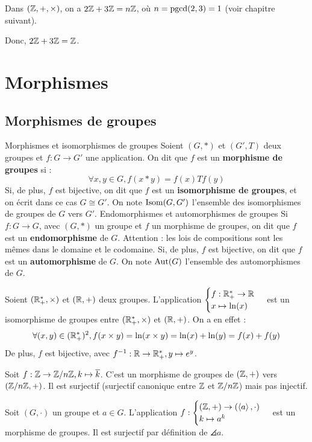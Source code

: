 \documentclass[12pt, a4paper]{report}
\begin{document}
\begin{example}
    Dans $(\mathbb{Z},+,\times)$, on a $2\mathbb{Z} + 3\mathbb{Z} = n\mathbb{Z}$, où $n = \mathrm{pgcd}(2,3) = 1$ (voir chapitre suivant).

    Donc, $2\mathbb{Z} + 3\mathbb{Z} = \mathbb{Z}$.
\end{example}

\chapter{Morphismes}

\section{Morphismes de groupes}

\begin{definition}
    \begin{outline}
        \1 Morphismes et isomorphismes de groupes
        \2 Soient $(G,*)$ et $(G',T)$ deux groupes et $f:G\to G'$ une application. On dit que $f$ est un \textbf{morphisme de groupes} si :
        $$\forall x,y \in G, f(x * y) = f(x) T f(y)$$
        \2 Si, de plus, $f$ est bijective, on dit que $f$ est un \textbf{isomorphisme de groupes}, et on écrit dans ce cas $G \cong G'$. On note $\mathrm{Isom}(G,G')$ l'ensemble des isomorphismes de groupes de $G$ vers $G'$.
        \1 Endomorphismes et automorphismes de groupes
        \2 Si $f:G\to G$, avec $(G,*)$ un groupe et $f$ un morphisme de groupes, on dit que $f$ est un \textbf{endomorphisme} de $G$. Attention : les lois de compositions sont les mêmes dans le domaine et le codomaine.
        \2 Si, de plus, $f$ est bijective, on dit que $f$ est un \textbf{automorphisme} de $G$. On note $\mathrm{Aut}(G)$ l'ensemble des automorphismes de $G$.
    \end{outline}
\end{definition}

\begin{example}
    Soient $(\mathbb{R}_+^*,\times)$ et $(\mathbb{R},+)$ deux groupes. L'application $\begin{cases}f : \mathbb{R}_+^* \to \mathbb{R}\\ x \mapsto \ln(x)\end{cases}$ est un isomorphisme de groupes entre $(\mathbb{R}_+^*,\times)$ et $(\mathbb{R},+)$. On a en effet :
    $$\forall (x,y) \in (\mathbb{R}_+^*)^2, f(x \times y) = \ln(x \times y) = \ln(x) + \ln(y) = f(x) + f(y)$$
    De plus, $f$ est bijective, avec $f^{-1} : \mathbb{R} \to \mathbb{R}_+^*, y \mapsto e^y$.

    Soit $f: \mathbb{Z} \to \mathbb{Z}/n\mathbb{Z}, k \mapsto \overline{k}$. C'est un morphisme de groupes de $(\mathbb{Z},+)$ vers $(\mathbb{Z}/n\mathbb{Z},+)$. Il est surjectif (surjectif canonique entre $\mathbb{Z}$ et $\mathbb{Z}/n\mathbb{Z}$) mais pas injectif.

    Soit $(G,\cdot)$ un groupe et $a\in G$. L'application $f:\begin{cases}(\mathbb{Z},+)\to(\left\langle a\right\rangle,\cdot)\\ k \mapsto a^k\end{cases}$ est un morphisme de groupes. Il est surjectif par définition de $\angles{a}$.
\end{example}
\end{document}
